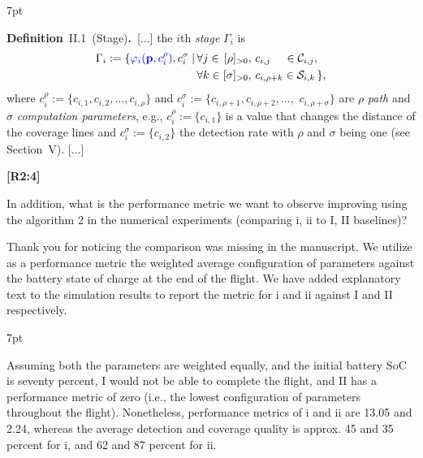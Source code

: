 \documentclass[10pt]{letter}
\newenvironment{formal}{%
  \def\FrameCommand{%
    \hspace{1pt}%
    {\color{red}\vrule width 2pt}%
    {\color{formalshade}\vrule width 4pt}%
    \colorbox{formalshade}%
  }%
  \MakeFramed{\advance\hsize-\width\FrameRestore}%
  \noindent\hspace{-4.55pt}%
  \begin{adjustwidth}{}{7pt}%
  \vspace{2pt}\vspace{2pt}%
}
{%
  \vspace{2pt}\end{adjustwidth}\endMakeFramed%
}
\begin{document}
{  \begin{formal}
    \color{black} 
    \textbf{Definition}~II.1~(Stage)\textbf{.}~[...] the $i$th \emph{stage} $\Gamma_i$ %
      is
    \begin{equation*}\begin{split}
        \Gamma_i:=\{{\color{blue}\varphi_i(\mathbf{p}%
        ,c_i^\rho)},c_i^\sigma\mid
        \,&\forall j\in\,[\rho]_{>0},\,c_{i,j}\,\,\,\,\,\,\,\in\mathcal{C}_{i,j},\,\\
          &\forall k\in[\sigma]_{>0},\,c_{i,\rho+k}\in\mathcal{S}_{i,k}\,\},
    \end{split}\end{equation*}
    where $c_i^\rho${\color{blue}$:=\{c_{i,1},c_{i,2},\dots,c_{i,\rho}\}$} and $c_i^\sigma${\color{blue}$:=\{c_{i,\rho+1},c_{i,\rho+2},\dots,$ $c_{i,\rho+\sigma}\}$} are $\rho$ \emph{path} and $\sigma$ \emph{computation parameters}{\color{blue}, e.g., $c_i^\rho:=\{c_{i,1}\}$ is a value that changes the distance of the coverage lines and $c^\sigma_i:=\{c_{i,2}\}$ the detection rate with $\rho$ and $\sigma$ being one (see Section~{\color{red}V})}. [...]
    \vspace*{1ex}
  \end{formal}



  }

  {\hspace*{-4.5em}\textbf{[R2:4]}\vspace*{-1.9em}}

  In addition, what is the performance metric we want to observe improving using the algorithm 2 in the numerical experiments (comparing i, ii to I, II baselines)? 
  
  {\color{blue} 
  
  {\hspace*{-4.5em}{[R2:4]}\vspace*{-1.9em}}

  Thank you for noticing the comparison was missing in the manuscript. We utilize as a performance metric the weighted average configuration of parameters against the battery state of charge at the end of the flight. We have added explanatory text to the simulation results to report the metric for i and ii against I and II respectively.

  \begin{formal}
    {\color{blue}
Assuming both the parameters are weighted equally, and the initial battery SoC is seventy percent, {\color{red}I} would not be able to complete the flight, and {\color{red}II} has a performance metric of zero (i.e., the lowest configuration of parameters throughout the flight).
Nonetheless, performance metrics of {\color{red}i} and {\color{red}ii} are 13.05 and 2.24, whereas the average detection and coverage quality is approx. 45 and 35 percent for {\color{red}i}, and 62 and 87 percent for {\color{red}ii}.}  
    \vspace*{1ex}
  \end{formal}
  }
\end{document}

